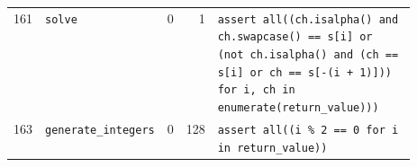 \begin{footnotesize}
\begin{longtable}{@{}r l r r p{0.52\linewidth}@{}}
161 & \texttt{solve} & 0 & 1 & \texttt{assert \allowbreak{}all(\allowbreak{}(\allowbreak{}ch.\allowbreak{}isalpha(\allowbreak{})\allowbreak{} \allowbreak{}and \allowbreak{}ch.\allowbreak{}swapcase(\allowbreak{})\allowbreak{} \allowbreak{}=\allowbreak{}=\allowbreak{} \allowbreak{}s[\allowbreak{}i]\allowbreak{} \allowbreak{}or \allowbreak{}(\allowbreak{}not \allowbreak{}ch.\allowbreak{}isalpha(\allowbreak{})\allowbreak{} \allowbreak{}and \allowbreak{}(\allowbreak{}ch \allowbreak{}=\allowbreak{}=\allowbreak{} \allowbreak{}s[\allowbreak{}i]\allowbreak{} \allowbreak{}or \allowbreak{}ch \allowbreak{}=\allowbreak{}=\allowbreak{} \allowbreak{}s[\allowbreak{}-\allowbreak{}(\allowbreak{}i \allowbreak{}+\allowbreak{} \allowbreak{}1)\allowbreak{}]\allowbreak{})\allowbreak{})\allowbreak{} \allowbreak{}for \allowbreak{}i,\allowbreak{} \allowbreak{}ch \allowbreak{}in \allowbreak{}enumerate(\allowbreak{}return\_value)\allowbreak{})\allowbreak{})\allowbreak{}} \\
163 & \texttt{generate\_integers} & 0 & 128 & \texttt{assert \allowbreak{}all(\allowbreak{}(\allowbreak{}i \allowbreak{}\% \allowbreak{}2 \allowbreak{}=\allowbreak{}=\allowbreak{} \allowbreak{}0 \allowbreak{}for \allowbreak{}i \allowbreak{}in \allowbreak{}return\_value)\allowbreak{})\allowbreak{}} \\
\end{longtable}
\end{footnotesize}
